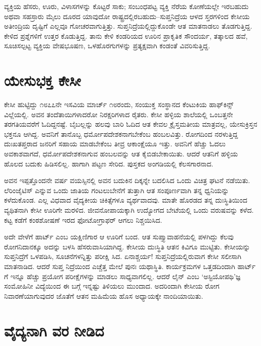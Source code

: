 ವ್ಯಕ್ತಿಯ ಹೆಸರು, ಊರು, ವಿಳಾಸಗಳನ್ನು ಕೊಟ್ಟರೆ ಸಾಕು; ಸಂಬಂಧಪಟ್ಟ ವ್ಯಕ್ತಿ ನೆರೆಯ ಕೋಣೆಯಲ್ಲೇ ಇರಬಹುದು ಅಥವಾ ಸಹಸ್ರಾರು ಮೈಲು ದೂರದ ಯಾವುದೋ ರಾಷ್ಟ್ರದಲ್ಲಿರಬಹುದು–ಸುಪ್ತನಿದ್ರೆಯ ಆಳದ ಸ್ತರಗಳಿಂದ ಕೇಸೀಯ ಅತೀಂದ್ರಿಯ ದೃಷ್ಟಿಗೆ ಎಲ್ಲವೂ ಗೋಚರವಾಗುತ್ತಿತ್ತು. ಸುಪ್ತನಿದ್ರೆಯಲ್ಲಿದ್ದುಕೊಂಡೇ ಆತ ಮಾತನಾಡಲು ತೊಡಗುತ್ತಿದ್ದ. ಕೇಳಿದ ಪ್ರಶ್ನೆಗಳಿಗೆ ಉತ್ತರ ಕೊಡುತ್ತಿದ್ದ. ತಾನು ಕೇಳಿ ಕಂಡರಿಯದ ಊರಿನ ಪ್ರಾಕೃತಿಕ ಸೌಂದರ್ಯ, ತತ್ಕಾಲದ ಹವೆ, ಸೂಚಿಸಲ್ಪಟ್ಟ ವ್ಯಕ್ತಿಯ ವೇಷಭೂಷಣ, ಒಳಹೊರಗುಗಳನ್ನು ಪ್ರತ್ಯಕ್ಷವಾಗಿ ಕಂಡಂತೆ ವಿವರಿಸುತ್ತಿದ್ದ.


\section{ಯೇಸುಭಕ್ತ ಕೇಸೀ}

ಕೇಸೀ ಹುಟ್ಟಿದ್ದು ೧೮೭೭ನೇ ಇಸವಿಯ ಮಾರ್ಚ್ ೧೮ರಂದು, ಸಂಯುಕ್ತ ಸಂಸ್ಥಾನದ ಕೆಂಟುಕಿಯ ಹಾಫ್​ಕಿನ್ಸ್​ವಿಲ್ಲೆಯಲ್ಲಿ. ಅವನ ತಂದೆತಾಯಿಗಳಾದರೋ ನಿರಕ್ಷರಿಗಳಾದ ರೈತರು. ಕೇಸೀ ಹಳ್ಳಿಯ ಶಾಲೆಯಲ್ಲಿ ಒಂಬತ್ತನೇ ತರಗತಿಯವರೆಗೆ ಓದಿದ್ದನಷ್ಟೆ. ಬೈಬಲ್ಲನ್ನು ಹಲವು ಬಾರಿ ಓದಿದ ಆತ ಕೇವಲ ಕ್ರೈಸ್ತಮತೀಯ ಮಾತ್ರವಲ್ಲ, ಯೇಸುಕ್ರಿಸ್ತನ ಭಕ್ತನೂ ಆಗಿದ್ದ. ಅವನಿಗೆ ತಾನೊಬ್ಬ ಧರ್ಮೋಪದೇಶಕನಾಗಬೇಕೆಂಬ ಹಂಬಲವಿತ್ತು. ರೋಗದಿಂದ ನರಳುತ್ತಿದ್ದ ದುಃಖತಪ್ತರಾದ ಜನರಿಗೆ ಸಹಾಯ ಮಾಡಬೇಕೆಂಬ ತೀವ್ರ ಆಕಾಂಕ್ಷೆಯೂ ಇತ್ತು. ಅವನಿಗೆ ಹೆಚ್ಚು ಓದಲು ಅವಕಾಶವಾಗದೆ, ಧರ್ಮೋಪದೇಶಕನಾಗುವ ಹಂಬಲವನ್ನು ಆತ ಕೈಬಿಡಬೇಕಾಯಿತು. ಆದರೆ ಆತನಿಗೆ ಹಳ್ಳಿಯ ಹೊಲದ ಬದುಕು ಹಿಡಿಸಲಿಲ್ಲ. ಹಾಗಾಗಿ ಪಟ್ಟಣ ಸೇರಿದ. ಪುಸ್ತಕದ ಅಂಗಡಿಯಲ್ಲಿ ಕೆಲಸಗಾರನಾದ.

ಅವನ ಇಪ್ಪತ್ತೊಂದನೇ ವರ್ಷ ವಯಸ್ಸಿನಲ್ಲಿ ಅವನ ಬದುಕಿನ ದಿಕ್ಕನ್ನೇ ಬದಲಿಸಿದ ಒಂದು ವಿಚಿತ್ರ ಘಟನೆ ನಡೆಯಿತು. ಲೆರಿಂಜೈಟಿಸ್ ಎನ್ನುವ ಒಂದು ಜಾತಿಯ ಗಂಟಲುಬೇನೆಗೆ ತುತ್ತಾಗಿ ಆತ ಸಂಪೂರ್ಣವಾಗಿ ತನ್ನ ಧ್ವನಿಯನ್ನು ಕಳೆದುಕೊಂಡ. ಎಲ್ಲ ವಿಧವಾದ ವೈದ್ಯಕೀಯ ಚಿಕಿತ್ಸೆಗಳೂ ವ್ಯರ್ಥವಾದವು. ಮಾತೇ ಹೊರಡದ ತನ್ನ ದುಃಸ್ಥಿತಿಯಿಂದ ವ್ಯಥಿತನಾಗಿ ಕೇಸೀ ಊರಿಗೇ ಮರಳಿದ. ಜೀವನೋಪಾಯಕ್ಕಾಗಿ ಉದ್ಯೋಗದ ಬೇಟೆಯಲ್ಲಿ ಒಂದು ವರುಷವನ್ನು ಕಳೆದ. ಕಟ್ಟ ಕಡೆಗೆ ಕಂಠಶೋಷಣೆ ಇರದ ಫೋಟೋಗ್ರಾಫರ್ ಆಗಲು ನಿಶ್ಚಯಿಸಿದ.

ಅದೇ ವೇಳೆಗೆ ಹಾರ್ಟ್ ಎಂಬ ಯಕ್ಷಿಣಿಗಾರ ಆ ಊರಿಗೆ ಬಂದ. ಆತ ಸುಪ್ತ್ಯಾವಾಹನೆಯಲ್ಲಿ ಪಳಗಿದ್ದು ಕೆಲವು ರೋಗನಿದಾನಕ್ಕೂ ಅದನ್ನು ಬಳಸಿ ಹೆಸರುವಾಸಿಯಾಗಿದ್ದ. ಕೇಸೀಯ ದುಃಸ್ಥಿತಿ ಆತನ ಕಿವಿಗೂ ಮುಟ್ಟಿತು. ಕೇಸೀಯನ್ನು ಸುಪ್ತನಿದ್ರೆಗೆ ಒಳಪಡಿಸಿ, ಸೂಚನೆಗಳನ್ನಿತ್ತು ಪರೀಕ್ಷಿ ಸಿದ. ಏನಾಶ್ಚರ್ಯ! ಸುಪ್ತನಿದ್ರೆಯಲ್ಲಿರುವಾಗ ಕೇಸೀ ಸಲೀಸಾಗಿ ಮಾತನಾಡಿದ. ಆದರೆ ಸುಪ್ತ ನಿದ್ರೆಯಿಂದ ಎಚ್ಚೆತ್ತ ಮೇಲೆ ಪುನಃ ಯಥಾಸ್ಥಿತಿ. ಕಾರ್ಯಕ್ರಮಗಳ ಒತ್ತಡದಿಂದಾಗಿ ಹಾರ್ಟ್​ಗೆ ಇನ್ನೂ ಹೆಚ್ಚು ಪ್ರಯೋಗ ಪರೀಕ್ಷೆಗಳನ್ನು ಮಾಡಲು ಸಾಧ್ಯವಾಗಲಿಲ್ಲ. ಆದರೆ ಲೈನ್ ಎಂಬ ‘ಅಸ್ಟಿಯೋಪಥಿ’ಜ್ಞ ಸಂಮೋಹಿನೀ ವಿದ್ಯೆಯಿಂದ ಈ ಬಗ್ಗೆ ಇನ್ನಷ್ಟು ತಿಳಿಯಲು ಮುಂದಾದ. ಅದರಿಂದಾಗಿ ಕೇಸೀಯ ರೋಗ ನಿವಾರಣೆಯಾಗುವುದರ ಜೊತೆಗೆ ಆತನ ಮಹಿಮೆಯ ಹೊಸ ಅಧ್ಯಾಯಕ್ಕೇ ನಾಂದಿಯಾಯಿತು.


\section{ವೈದ್ಯನಾಗಿ ವರ ನೀಡಿದ}

